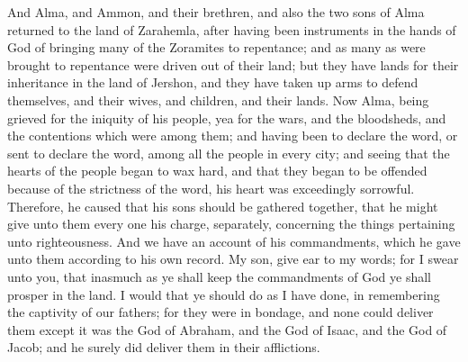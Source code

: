 And Alma, and Ammon, and their brethren, and also the two sons of Alma returned to the land of Zarahemla, after having been instruments in the hands of God of bringing many of the Zoramites to repentance; and as many as were brought to repentance were driven out of their land; but they have lands for their inheritance in the land of Jershon, and they have taken up arms to defend themselves, and their wives, and children, and their lands.
\bverse \iffalse Now Alma, being grieved for the iniquity of his people, yea for the wars, and the bloodsheds, and the contentions which were among them; and having been to declare the word, or sent to declare the word, among all the people in every city; and seeing that the hearts of the people began to wax hard, and that they began to be offended because of the strictness of the word, his heart was exceedingly sorrowful. \fi
Now Alma, being grieved for the iniquity of his people, yea for the wars, and the bloodsheds, and the contentions which were among them; and having been to declare the word, or sent to declare the word, among all the people in every city; and seeing that the hearts of the people began to wax hard, and that they began to be offended because of the strictness of the word, his heart was exceedingly sorrowful.
\bverse \iffalse Therefore, he caused that his sons should be gathered together, that he might give unto them every one his charge, separately, concerning the things pertaining unto righteousness.  And we have an account of his commandments, which he gave unto them according to his own record. \fi
Therefore, he caused that his sons should be gathered together, that he might give unto them every one his charge, separately, concerning the things pertaining unto righteousness.  And we have an account of his commandments, which he gave unto them according to his own record.
\bchapter
\bverse \iffalse My son, give ear to my words; for I swear unto you, that inasmuch as ye shall keep the commandments of God ye shall prosper in the land. \fi
My son, give ear to my words; for I swear unto you, that inasmuch as ye shall keep the commandments of God ye shall prosper in the land.
\bverse \iffalse I would that ye should do as I have done, in remembering the captivity of our fathers; for they were in bondage, and none could deliver them except it was the God of Abraham, and the God of Isaac, and the God of Jacob; and he surely did deliver them in their afflictions. \fi
I would that ye should do as I have done, in remembering the captivity of our fathers; for they were in bondage, and none could deliver them except it was the God of Abraham, and the God of Isaac, and the God of Jacob; and he surely did deliver them in their afflictions.
